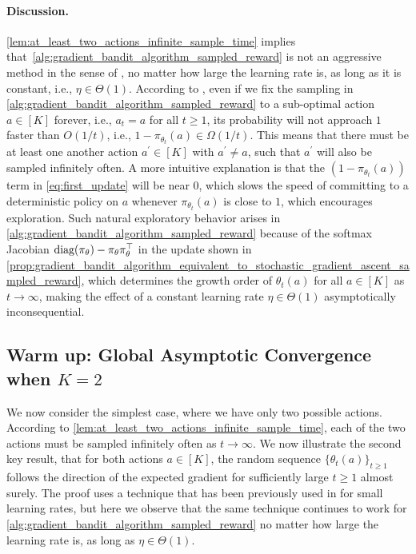 \paragraph{Discussion.}
\cref{lem:at_least_two_actions_infinite_sample_time} implies that~\cref{alg:gradient_bandit_algorithm_sampled_reward} is not an aggressive method in the sense of \citep{mei2021understanding}, no matter how large the learning rate is, as long as it is constant, i.e., $\eta \in \Theta(1)$. According to \citep[Theorem 7]{mei2021understanding}, even if we fix the sampling in \cref{alg:gradient_bandit_algorithm_sampled_reward} to a sub-optimal action $a \in [K]$ forever, i.e., $a_t = a$ for all $t \ge 1$, its probability will not approach $1$ faster than $O(1/t)$, i.e., $1 - \pi_{\theta_t}(a) \in \Omega(1/t)$.  This means that there must be at least one another action $a^\prime \in [K]$ with $a^\prime \ne a$, such that $a^\prime$ will also be sampled  infinitely often. A more intuitive explanation is that the $\left( 1 - \pi_{\theta_t}(a) \right)$ term in \cref{eq:first_update} will be near $0$, which slows the speed of committing to a  deterministic policy on $a$ whenever $\pi_{\theta_t}(a)$ is close to $1$, %
which encourages exploration. Such natural exploratory behavior arises in \cref{alg:gradient_bandit_algorithm_sampled_reward} because of the softmax Jacobian $  \text{diag}{(\pi_{\theta})} - \pi_{\theta} \pi_{\theta}^\top $ in the update shown in \cref{prop:gradient_bandit_algorithm_equivalent_to_stochastic_gradient_ascent_sampled_reward}, which determines the growth order of $\theta_t(a)$ for all $a \in [K]$ as $t \to \infty$, making the effect of a constant learning rate $\eta \in \Theta(1)$  asymptotically inconsequential.


\subsection{Warm up: Global Asymptotic Convergence when $K = 2$}

We now consider the simplest case, where we have only two possible actions. According to \cref{lem:at_least_two_actions_infinite_sample_time}, each of the two actions must be sampled infinitely often as $t \to \infty$. We now illustrate the second key result, that for both actions $a \in [K]$, the random sequence $\{ \theta_t(a) \}_{t \ge 1}$ follows the direction of the expected gradient for sufficiently large $t \ge 1$ almost surely. The proof uses a technique that has been previously used in \citep{mei2022role,mei2024stochastic} for small learning rates, but here we observe that the same technique continues to work for \cref{alg:gradient_bandit_algorithm_sampled_reward} no matter how large the learning rate is, as long as $\eta \in \Theta(1)$.

